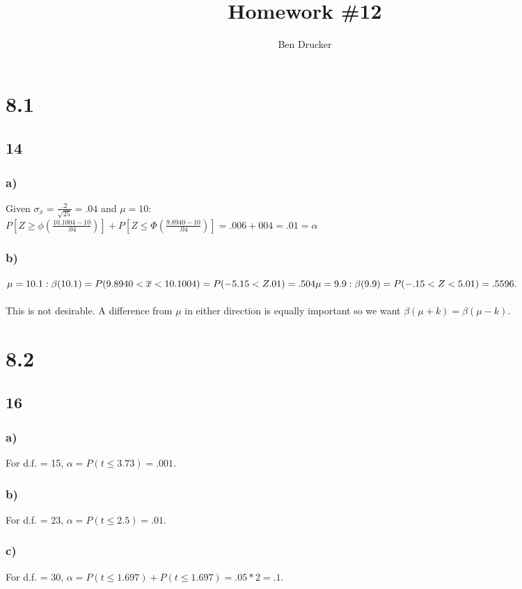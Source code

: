 \documentclass{article}
\newcommand{\hwkNum}{12}
\newcommand{\hwkAuthors}{Ben Drucker}
\begin{document}
\title{Homework \#\hwkNum}
\author{\hwkAuthors}
\date{}

\maketitle


\section*{8.1}
	\subsection*{14}
		\subsubsection*{a)}
			Given $\sigma_{\overline{x}} = \frac{.2}{\sqrt{25}} = .04$ and $\mu =10$:\\
			$P[Z \geq \phi (\frac{10.1004-10}{.04})] + P[Z \leq \Phi (\frac{9.8940-10}{.04})] = .006 + 004 = .01 = \alpha$ 
		\subsubsection*{b)}
			$\mu = 10.1: \beta (10.1) = P(9.8940 < \overline{x} < 10.1004) = P(-5.15 < Z .01) = .504\\
			\mu = 9.9: \beta(9.9) = P(-.15 < Z < 5.01) = .5596.$ \\\\
			This is not desirable. A difference from $\mu$ in either direction is equally important so we want $\beta(\mu + k) = \beta(\mu - k)$.  
\section*{8.2}
	\subsection*{16}
		\subsubsection*{a)}
			For d.f. = 15, $\alpha = P(t\leq 3.73) = .001.$
		\subsubsection*{b)}
			For d.f. = 23, $\alpha = P(t \leq 2.5) = .01.$
		\subsubsection*{c)}
			For d.f. = 30, $\alpha = P(t \leq 1.697) + P(t \leq 1.697) = .05 * 2 =.1.$		
\end{document}
